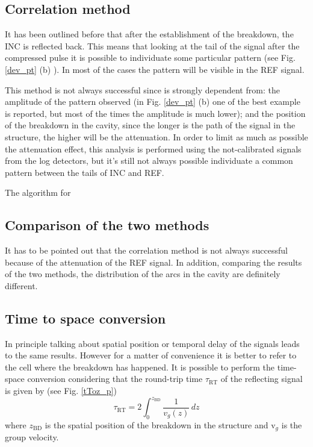 \subsection[Correlation method]{Correlation method}

It has been outlined before that after the establishment of the breakdown, the INC is reflected back. This means that looking at the tail of the signal after the compressed pulse it is possible to individuate some particular pattern (see Fig. \ref{dev_pt} (b) ). In most of the cases the pattern will be visible in the REF signal. 

This method is not always successful since is strongly dependent from: the amplitude of the pattern observed (in Fig. \ref{dev_pt} (b) one of the best example is reported, but most of the times the amplitude is much lower); and the position of the breakdown in the cavity, since the longer is the path of the signal in the structure, the higher will be the attenuation. In order to limit as much as possible the attenuation effect, this analysis is performed using the not-calibrated signals from the log detectors, but it's still not always possible individuate a common pattern between the tails of INC and REF.

The algorithm for 



\subsection[Comparison of the two methods]{Comparison of the two methods}

It has to be pointed out that the correlation method is not always successful because of the attenuation of the REF signal. In addition, comparing the results of the two methods, the distribution of the arcs in the cavity are definitely different. 







\subsection[Time to space conversion]{Time to space conversion}

In principle talking about spatial position or temporal delay of the signals leads to the same results. However for a matter of convenience it is better to refer to the cell where the breakdown has happened. It is possible to perform the time-space conversion considering that the round-trip time $\tau_{\text{RT}}$  of the reflecting signal is given by (see Fig. \ref{tToz_p})
\begin{equation}
\tau_{\text{RT}} = 2 \int_0^{z_{\text{BD}}} \frac{1}{v_g (z)} \, dz
\label{tRT}
\end{equation}
where $z_{\text{BD}}$ is the spatial position of the breakdown in the structure and v$_g$ is the group velocity.


